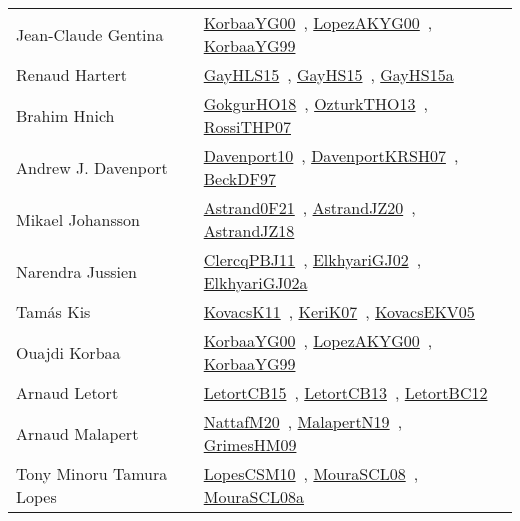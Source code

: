 {\begin{longtable}{p{4cm}p{20cm}}
Jean{-}Claude Gentina & \href{works/KorbaaYG00.pdf}{KorbaaYG00}~\cite{KorbaaYG00}, \href{works/LopezAKYG00.pdf}{LopezAKYG00}~\cite{LopezAKYG00}, \href{works/KorbaaYG99.pdf}{KorbaaYG99}~\cite{KorbaaYG99}\\
Renaud Hartert & \href{works/GayHLS15.pdf}{GayHLS15}~\cite{GayHLS15}, \href{works/GayHS15.pdf}{GayHS15}~\cite{GayHS15}, \href{works/GayHS15a.pdf}{GayHS15a}~\cite{GayHS15a}\\
Brahim Hnich & \href{}{GokgurHO18}~\cite{GokgurHO18}, \href{works/OzturkTHO13.pdf}{OzturkTHO13}~\cite{OzturkTHO13}, \href{works/RossiTHP07.pdf}{RossiTHP07}~\cite{RossiTHP07}\\
Andrew J. Davenport & \href{works/Davenport10.pdf}{Davenport10}~\cite{Davenport10}, \href{works/DavenportKRSH07.pdf}{DavenportKRSH07}~\cite{DavenportKRSH07}, \href{works/BeckDF97.pdf}{BeckDF97}~\cite{BeckDF97}\\
Mikael Johansson & \href{works/Astrand0F21.pdf}{Astrand0F21}~\cite{Astrand0F21}, \href{works/AstrandJZ20.pdf}{AstrandJZ20}~\cite{AstrandJZ20}, \href{works/AstrandJZ18.pdf}{AstrandJZ18}~\cite{AstrandJZ18}\\
Narendra Jussien & \href{works/ClercqPBJ11.pdf}{ClercqPBJ11}~\cite{ClercqPBJ11}, \href{works/ElkhyariGJ02.pdf}{ElkhyariGJ02}~\cite{ElkhyariGJ02}, \href{works/ElkhyariGJ02a.pdf}{ElkhyariGJ02a}~\cite{ElkhyariGJ02a}\\
Tam{\'{a}}s Kis & \href{works/KovacsK11.pdf}{KovacsK11}~\cite{KovacsK11}, \href{works/KeriK07.pdf}{KeriK07}~\cite{KeriK07}, \href{works/KovacsEKV05.pdf}{KovacsEKV05}~\cite{KovacsEKV05}\\
Ouajdi Korbaa & \href{works/KorbaaYG00.pdf}{KorbaaYG00}~\cite{KorbaaYG00}, \href{works/LopezAKYG00.pdf}{LopezAKYG00}~\cite{LopezAKYG00}, \href{works/KorbaaYG99.pdf}{KorbaaYG99}~\cite{KorbaaYG99}\\
Arnaud Letort & \href{works/LetortCB15.pdf}{LetortCB15}~\cite{LetortCB15}, \href{works/LetortCB13.pdf}{LetortCB13}~\cite{LetortCB13}, \href{works/LetortBC12.pdf}{LetortBC12}~\cite{LetortBC12}\\
Arnaud Malapert & \href{works/NattafM20.pdf}{NattafM20}~\cite{NattafM20}, \href{works/MalapertN19.pdf}{MalapertN19}~\cite{MalapertN19}, \href{works/GrimesHM09.pdf}{GrimesHM09}~\cite{GrimesHM09}\\
Tony Minoru Tamura Lopes & \href{works/LopesCSM10.pdf}{LopesCSM10}~\cite{LopesCSM10}, \href{works/MouraSCL08.pdf}{MouraSCL08}~\cite{MouraSCL08}, \href{works/MouraSCL08a.pdf}{MouraSCL08a}~\cite{MouraSCL08a}\\

\end{longtable}}
